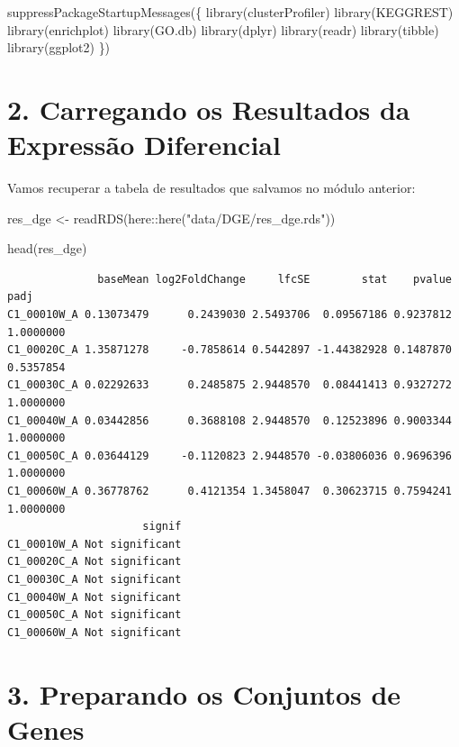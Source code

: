 \documentclass[
  letterpaper,
  DIV=11,
  numbers=noendperiod]{scrreprt}
\newenvironment{Shaded}{\begin{snugshade}}{\end{snugshade}}
\newcommand{\FunctionTok}[1]{\textcolor[rgb]{0.28,0.35,0.67}{#1}}
\newcommand{\NormalTok}[1]{\textcolor[rgb]{0.00,0.23,0.31}{#1}}
\newcommand{\OtherTok}[1]{\textcolor[rgb]{0.00,0.23,0.31}{#1}}
\newcommand{\SpecialCharTok}[1]{\textcolor[rgb]{0.37,0.37,0.37}{#1}}
\newcommand{\StringTok}[1]{\textcolor[rgb]{0.13,0.47,0.30}{#1}}
\begin{document}
\begin{Shaded}
\begin{Highlighting}[]
\FunctionTok{suppressPackageStartupMessages}\NormalTok{(\{}
  \FunctionTok{library}\NormalTok{(clusterProfiler)}
  \FunctionTok{library}\NormalTok{(KEGGREST)}
  \FunctionTok{library}\NormalTok{(enrichplot)}
  \FunctionTok{library}\NormalTok{(GO.db)}
  \FunctionTok{library}\NormalTok{(dplyr)}
  \FunctionTok{library}\NormalTok{(readr)}
  \FunctionTok{library}\NormalTok{(tibble)}
  \FunctionTok{library}\NormalTok{(ggplot2)}
\NormalTok{\})}
\end{Highlighting}
\end{Shaded}

\section{2. Carregando os Resultados da Expressão
Diferencial}\label{carregando-os-resultados-da-expressuxe3o-diferencial}

Vamos recuperar a tabela de resultados que salvamos no módulo anterior:

\begin{Shaded}
\begin{Highlighting}[]
\NormalTok{res\_dge }\OtherTok{\textless{}{-}} \FunctionTok{readRDS}\NormalTok{(here}\SpecialCharTok{::}\FunctionTok{here}\NormalTok{(}\StringTok{"data/DGE/res\_dge.rds"}\NormalTok{))}

\FunctionTok{head}\NormalTok{(res\_dge)}
\end{Highlighting}
\end{Shaded}

\begin{verbatim}
              baseMean log2FoldChange     lfcSE        stat    pvalue      padj
C1_00010W_A 0.13073479      0.2439030 2.5493706  0.09567186 0.9237812 1.0000000
C1_00020C_A 1.35871278     -0.7858614 0.5442897 -1.44382928 0.1487870 0.5357854
C1_00030C_A 0.02292633      0.2485875 2.9448570  0.08441413 0.9327272 1.0000000
C1_00040W_A 0.03442856      0.3688108 2.9448570  0.12523896 0.9003344 1.0000000
C1_00050C_A 0.03644129     -0.1120823 2.9448570 -0.03806036 0.9696396 1.0000000
C1_00060W_A 0.36778762      0.4121354 1.3458047  0.30623715 0.7594241 1.0000000
                     signif
C1_00010W_A Not significant
C1_00020C_A Not significant
C1_00030C_A Not significant
C1_00040W_A Not significant
C1_00050C_A Not significant
C1_00060W_A Not significant
\end{verbatim}

\section{3. Preparando os Conjuntos de
Genes}\label{preparando-os-conjuntos-de-genes}
\end{document}
